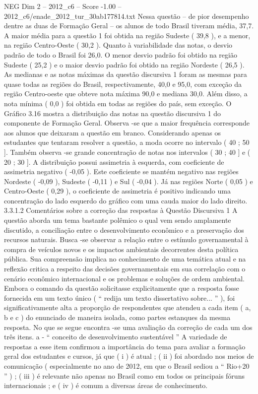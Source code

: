 \begin{textsample}{NEG Dim 2 – 2012\_c6 – Score -1.00 – 2012\_c6/enade\_2012\_tur\_30ab177814.txt}
Nessa questão – de pior desempenho dentre as duas de Formação Geral – os alunos de todo Brasil tiveram média, 37,7.
A maior média para a questão 1 foi obtida na região Sudeste ( 39,8 ), e a menor, na região Centro-Oeste ( 30,2 ).
Quanto à variabilidade das notas, o desvio padrão de todo o Brasil foi 26,0.
O menor desvio padrão foi obtido na região Sudeste ( 25,2 ) e o maior desvio padrão foi obtido na região Nordeste ( 26,5 ).
As medianas e as notas máximas da questão discursiva 1 foram as mesmas para quase todas as regiões do Brasil, respectivamente, 40,0 e 95,0, com exceção da região Centro-oeste que obteve nota máxima 90,0 e mediana 30,0.
Além disso, a nota mínima ( 0,0 ) foi obtida em todas as regiões do país, sem exceção.
O Gráfico 3.16 mostra a distribuição das notas na questão discursiva 1 do componente de Formação Geral.
Observa -se que a maior frequência corresponde aos alunos que deixaram a questão em branco.
Considerando apenas os estudantes que tentaram resolver a questão, a moda ocorre no intervalo ( 40 ; 50 ].
Também observa -se grande concentração de notas nos intervalos ( 30 ; 40 ] e ( 20 ; 30 ].
A distribuição possui assimetria à esquerda, com coeficiente de assimetria negativo ( -0,05 ).
Este coeficiente se mantém negativo nas regiões Nordeste ( -0,09 ), Sudeste ( -0,11 ) e Sul ( -0,04 ).
Já nas regiões Norte ( 0,05 ) e Centro-Oeste ( 0,29 ), o coeficiente de assimetria é positivo indicando uma concentração do lado esquerdo do gráfico com uma cauda maior do lado direito. 3.3.1.2 Comentários sobre a correção das respostas à Questão Discursiva 1 A questão aborda um tema bastante polêmico o qual vem sendo amplamente discutido, a conciliação entre o desenvolvimento econômico e a preservação dos recursos naturais.
Busca -se observar a relação entre o estímulo governamental à compra de veículos novos e os impactos ambientais decorrentes desta política pública.
Sua compreensão implica no conhecimento de uma temática atual e na reflexão critica a respeito das decisões governamentais em sua correlação com o cenário econômico internacional e os problemas e soluções de ordem ambiental.
Embora o comando da questão solicitasse explicitamente que a resposta fosse fornecida em um texto único ( “ redija um texto dissertativo sobre... ” ), foi significativamente alta a proporção de respondentes que atendeu a cada item ( a, b e c ) do enunciado de maneira isolada, como partes estanques da mesma resposta.
No que se segue encontra -se uma avaliação da correção de cada um dos três itens. a - “ conceito de desenvolvimento sustentável ” A variedade de respostas a esse item confirmou a importância do tema para avaliar a formação geral dos estudantes e cursos, já que ( i ) é atual ; ( ii ) foi abordado nos meios de comunicação ( especialmente no ano de 2012, em que o Brasil sediou a “ Rio+20 ” ) ; ( iii ) é relevante não apenas no Brasil como em todos os principais fóruns internacionais ; e ( iv ) é comum a diversas áreas de conhecimento.

\end{textsample}
